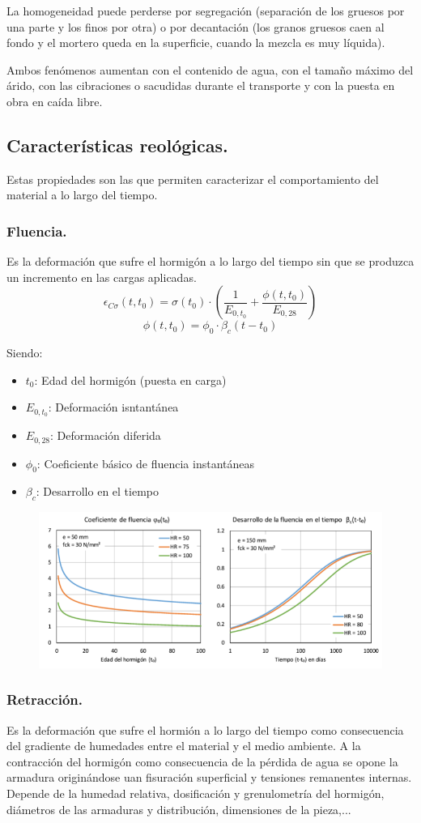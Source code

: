 La homogeneidad puede perderse por segregación (separación de los gruesos por una parte y los finos por otra) o por decantación (los granos gruesos caen al fondo y el mortero queda en la superficie, cuando la mezcla es muy líquida).

Ambos fenómenos aumentan con el contenido de agua, con el tamaño máximo del árido, con las cibraciones o sacudidas durante el transporte y con la puesta en obra en caída libre.

\subsection{Características reológicas.}
Estas propiedades son las que permiten caracterizar el comportamiento del material a lo largo del tiempo.

\subsubsection{Fluencia.}
Es la deformación que sufre el hormigón a lo largo del tiempo sin que se produzca un incremento en las cargas aplicadas.
\[ \epsilon_{C \sigma} (t, t_0) = \sigma (t_0) \cdot \left( \frac{1}{E_{0, t_0}} + \frac{\phi(t, t_0)}{E_{0,28}} \right) \]
\[ \phi(t, t_0) = \phi_0 \cdot \beta_c (t - t_0) \]

Siendo:
\begin{itemize}
    \item $t_0$: Edad del hormigón (puesta en carga)
    \item $E_{0, t_0}$: Deformación isntantánea
    \item $E_{0, 28}$: Deformación diferida
    \item $\phi_0$: Coeficiente básico de fluencia instantáneas
    \item $\beta_c$: Desarrollo en el tiempo
\end{itemize}

\begin{figure}[H]
    \centering
    \includegraphics[width = 0.5 \textwidth]{Imagenes/Graficas Fluencia.png}
\end{figure}

\subsubsection{Retracción.}
Es la deformación que sufre el hormión a lo largo del tiempo como consecuencia del gradiente de humedades entre el material y el medio ambiente. A la contracción del hormigón como consecuencia de la pérdida de agua se opone la armadura originándose uan fisuración superficial y tensiones remanentes internas. Depende de la humedad relativa, dosificación y grenulometría del hormigón, diámetros de las armaduras y distribución, dimensiones de la pieza,... 

